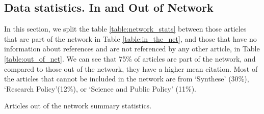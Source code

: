 \documentclass[smallextended]{svjour3}
\begin{document}
\begin{appendices}
		\pagebreak
		
		
		\section{Data statistics. In and Out of Network}\label{sec:oon_stats}
		\setcounter{table}{0}
		\setcounter{figure}{0}    
		
		In this section, we split the table \ref{table:network_stats} between those articles that are part of the network in Table \ref{table:in_the_net}, and those that have no information about references and are not referenced by any other article, in Table \ref{table:out_of_net}. We can see that 75\% of articles are part of the network, and compared to those out of the network, they have a higher mean citation. Most of the articles that cannot be included in the network are from `Synthese' (30\%), `Research Policy'(12\%), or `Science and Public Policy' (11\%).
		
		
		\begin{table}[!t]
			\centering
			\caption{Articles out of the network summary statistics.}
			\label{table:out_of_net}


\end{table}
\end{appendices}
\end{document}

